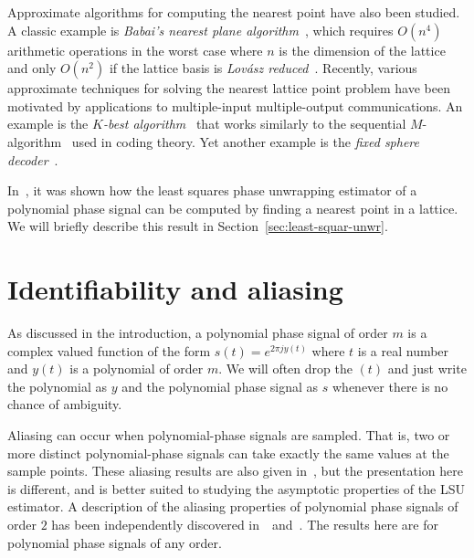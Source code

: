 \documentclass[journal]{IEEEtran}
\begin{document}
Approximate algorithms for computing the nearest point have also been studied.  A classic example is \emph{Babai's nearest plane algorithm}~\cite{Babai1986}, which requires $O(n^4)$ arithmetic operations in the worst case where $n$ is the dimension of the lattice and only $O(n^2)$ if the lattice basis is \emph{Lov\'asz reduced}~\cite{Lenstra1982}. Recently, various approximate techniques for solving the nearest lattice point problem have been motivated by applications to multiple-input multiple-output communications.  An example is the \emph{$K$-best algorithm}~\cite{Zhan2006_K_best_sphere_decoder} that works similarly to the sequential $M$-algorithm~\cite{Anderson1984_seq_coding_alg} used in coding theory. Yet another example is the \emph{fixed sphere decoder}~\cite{Jalden2009_error_prob_fixed_sphere_decoder,Barbero2008_fixed_sphere_decoder}.

In~\cite{McKilliam2009asilomar_polyest_lattice}, it was shown how the least squares phase unwrapping estimator of a polynomial phase signal can be computed by finding a nearest point in a lattice.  We will briefly describe this result in Section~\ref{sec:least-squar-unwr}.



\section{Identifiability and aliasing}\label{sec:ident_aliasing}

As discussed in the introduction, a polynomial phase signal of order $m$ is a complex valued function of the form $s(t) = e^{2\pi j y(t)}$ where $t$ is a real number and $y(t)$ is a polynomial of order $m$. We will often drop the $(t)$ and just write the polynomial as $y$ and the polynomial phase signal as $s$ whenever there is no chance of ambiguity. %

Aliasing can occur when polynomial-phase signals are sampled.  That is, two or more distinct polynomial-phase signals can take exactly the same values at the sample points.  These aliasing results are also given in~\cite{McKilliam2009IndentifiabliltyAliasingPolyphase}, but the presentation here is different, and is better suited to studying the asymptotic properties of the LSU estimator.  A description of the aliasing properties of polynomial phase signals of order $2$ has been independently discovered in~\cite{Abatzoglou_ml_chirp_1986}~and~\cite{Angeby_PPS_aliasing_2000}.  The results here are for polynomial phase signals of any order.
\end{document}
